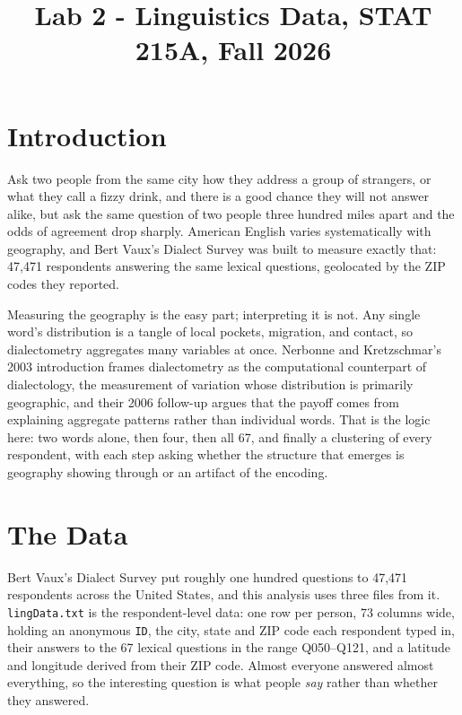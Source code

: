 \documentclass[10pt,letterpaper]{article}
\title{Lab 2 - Linguistics Data, STAT 215A, Fall 2026\vspace{-2em}}
\begin{document}
\maketitle

\section{Introduction}\label{introduction}

Ask two people from the same city how they address a group of strangers, or
what they call a fizzy drink, and there is a good chance they will not answer
alike, but ask the same question of two people three hundred miles apart and
the odds of agreement drop sharply. American English varies systematically
with geography, and Bert Vaux's Dialect Survey was built to measure exactly
that: 47,471 respondents answering the same lexical questions, geolocated by
the ZIP codes they reported.

Measuring the geography is the easy part; interpreting it is not. Any single
word's distribution is a tangle of local pockets, migration, and contact, so
dialectometry aggregates many variables at once. Nerbonne and Kretzschmar's
2003 introduction frames dialectometry as the computational counterpart of
dialectology, the measurement of variation whose distribution is primarily
geographic, and their 2006 follow-up argues that the payoff comes from
explaining aggregate patterns rather than individual words. That is the logic
here: two words alone, then four, then all 67, and finally a clustering of
every respondent, with each step asking whether the structure that emerges is
geography showing through or an artifact of the encoding.

\section{The Data}\label{data}

Bert Vaux's Dialect Survey put roughly one hundred questions to 47,471
respondents across the United States, and this analysis uses three files from
it. \texttt{lingData.txt} is the respondent-level data: one row per person, 73
columns wide, holding an anonymous \texttt{ID}, the city, state and ZIP code
each respondent typed in, their answers to the 67 lexical questions in the
range Q050--Q121, and a latitude and longitude derived from their ZIP code.
Almost everyone answered almost everything, so the interesting question is what
people \emph{say} rather than whether they answered.
\end{document}
